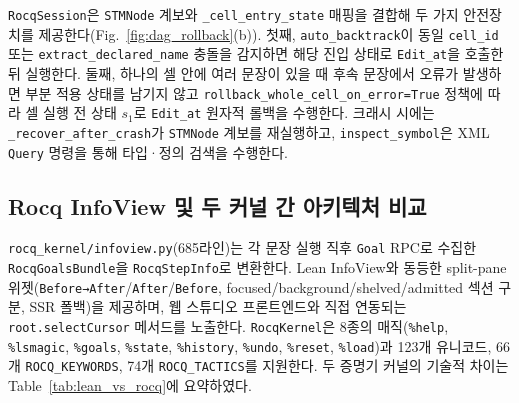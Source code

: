 \documentclass[journal]{IEEEtran}
\newcommand{\code}[1]{\texttt{#1}}
\begin{document}
\code{RocqSession}은 \code{STMNode} 계보와 \code{\_cell\_entry\_state} 매핑을 결합해 두 가지 안전장치를 제공한다(Fig.~\ref{fig:dag_rollback}(b)). 첫째, \code{auto\_backtrack}이 동일 \code{cell\_id} 또는 \code{extract\_declared\_name} 충돌을 감지하면 해당 진입 상태로 \code{Edit\_at}을 호출한 뒤 실행한다. 둘째, 하나의 셀 안에 여러 문장이 있을 때 후속 문장에서 오류가 발생하면 부분 적용 상태를 남기지 않고 \code{rollback\_whole\_cell\_on\_error=True} 정책에 따라 셀 실행 전 상태 $s_1$로 \code{Edit\_at} 원자적 롤백을 수행한다. 크래시 시에는 \code{\_recover\_after\_crash}가 \code{STMNode} 계보를 재실행하고, \code{inspect\_symbol}은 XML \code{Query} 명령을 통해 타입·정의 검색을 수행한다.

\subsection{Rocq InfoView 및 두 커널 간 아키텍처 비교}
\code{rocq\_kernel/infoview.py}(685라인)는 각 문장 실행 직후 \code{Goal} RPC로 수집한 \code{RocqGoalsBundle}을 \code{RocqStepInfo}로 변환한다. Lean InfoView와 동등한 split-pane 위젯(\code{Before→After}/\code{After}/\code{Before}, focused/background/shelved/admitted 섹션 구분, SSR 폴백)을 제공하며, 웹 스튜디오 프론트엔드와 직접 연동되는 \code{root.selectCursor} 메서드를 노출한다. \code{RocqKernel}은 8종의 매직(\code{\%help}, \code{\%lsmagic}, \code{\%goals}, \code{\%state}, \code{\%history}, \code{\%undo}, \code{\%reset}, \code{\%load})과 123개 유니코드, 66개 \code{ROCQ\_KEYWORDS}, 74개 \code{ROCQ\_TACTICS}를 지원한다. 두 증명기 커널의 기술적 차이는 Table~\ref{tab:lean_vs_rocq}에 요약하였다.
\end{document}
